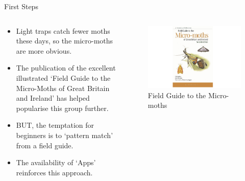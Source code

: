 \documentclass[
  ignorenonframetext,
]{beamer}
\providecommand{\tightlist}{%
  \setlength{\itemsep}{0pt}\setlength{\parskip}{0pt}}
\begin{document}
\begin{frame}{First Steps}
\protect\hypertarget{first-steps}{}
\begin{columns}[T]
\begin{column}{0.5\textwidth}
\begin{itemize}
\tightlist
\item
  Light traps catch fewer moths these days, so the micro-moths are more
  obvious.
\item
  The publication of the excellent illustrated `Field Guide to the
  Micro-Moths of Great Britain and Ireland' has helped popularise this
  group further.
\item
  BUT, the temptation for beginners is to `pattern match' from a field
  guide.
\item
  The availability of `Apps' reinforces this approach.
\end{itemize}
\end{column}

\begin{column}{0.5\textwidth}
\begin{figure}
\centering
\includegraphics{./images/micro-field-guide.jpg}
\caption{Field Guide to the Micro-moths}
\end{figure}
\end{column}
\end{columns}
\end{frame}
\end{document}
